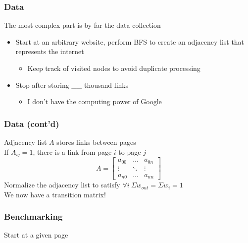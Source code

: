 \documentclass{beamer}
\begin{document}
\begin{frame}
  \frametitle{Data}
  The most complex part is by far the data collection
  \begin{itemize}
  \item Start at an arbitrary website, perform BFS to create an adjacency list
    that represents the internet
      \begin{itemize}
        \item Keep track of visited nodes to avoid duplicate processing
      \end{itemize}
  \item Stop after storing \_\_ thousand links %
      \begin{itemize}
        \item I don't have the computing power of Google
      \end{itemize}
  \end{itemize}

\end{frame}

\begin{frame}
  \frametitle{Data (cont'd)}  
  Adjacency list $A$ stores links between pages \\
  If $A_{ij} = 1$, there is a link from page $i$ to page $j$
  $$
    A = 
    \begin{bmatrix}
    a_{00} & \dots & a_{0n}\\ 
    \vdots & \ddots & \vdots \\ 
    a_{n0} & \dots & a_{nn} 
    \end{bmatrix}
  $$
  Normalize the adjacency list to satisfy $\forall i \  \Sigma w_{out} = \Sigma w_i = 1$ \\
  We now have a transition matrix!
\end{frame}

\begin{frame}
  \frametitle{Benchmarking}
  Start at a given page
\end{frame}
\end{document}
